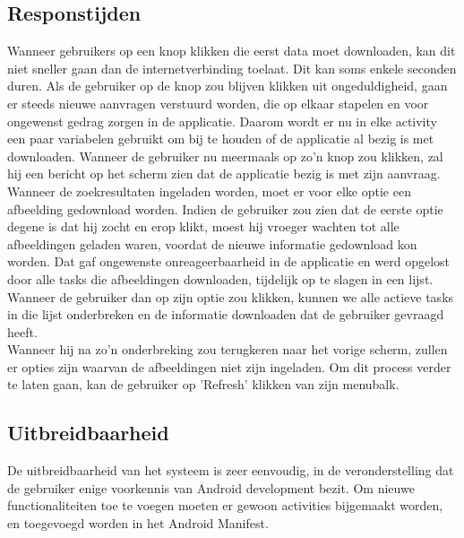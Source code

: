 \documentclass[11pt,a4paper]{article}
\begin{document}
	\subsection{Responstijden}
	\label{sec:responsetijden}
	Wanneer gebruikers op een knop klikken die eerst data moet downloaden, kan dit niet sneller gaan dan de internetverbinding toelaat. Dit kan soms enkele seconden duren. Als de gebruiker op de knop zou blijven klikken uit ongeduldigheid, gaan er steeds nieuwe aanvragen verstuurd worden, die op elkaar stapelen en voor ongewenst gedrag zorgen in de applicatie. Daarom wordt er nu in elke activity een paar variabelen gebruikt om bij te houden of de applicatie al bezig is met downloaden. Wanneer de gebruiker nu meermaals op zo'n knop zou klikken, zal hij een bericht op het scherm zien dat de applicatie bezig is met zijn aanvraag. \\
	Wanneer de zoekresultaten ingeladen worden, moet er voor elke optie een afbeelding gedownload worden. Indien de gebruiker zou zien dat de eerste optie degene is dat hij zocht en erop klikt, moest hij vroeger wachten tot alle afbeeldingen geladen waren, voordat de nieuwe informatie gedownload kon worden. Dat gaf ongewenste onreageerbaarheid in de applicatie en werd opgelost door alle tasks die afbeeldingen downloaden, tijdelijk op te slagen in een lijst. Wanneer de gebruiker dan op zijn optie zou klikken, kunnen we alle actieve tasks in die lijst onderbreken en de informatie downloaden dat de gebruiker gevraagd heeft. \\
	Wanneer hij na zo'n onderbreking zou terugkeren naar het vorige scherm, zullen er opties zijn waarvan de afbeeldingen niet zijn ingeladen. Om dit process verder te laten gaan, kan de gebruiker op 'Refresh' klikken van zijn menubalk.
	
	\subsection{Uitbreidbaarheid}
	\label{sec:Uitbreidbaarheid}
	De uitbreidbaarheid van het systeem is zeer eenvoudig, in de veronderstelling dat de gebruiker  enige voorkennis van Android development bezit. Om nieuwe functionaliteiten toe te voegen moeten er gewoon activities bijgemaakt worden, en toegevoegd worden in het Android Manifest.\\
	
\end{document}
